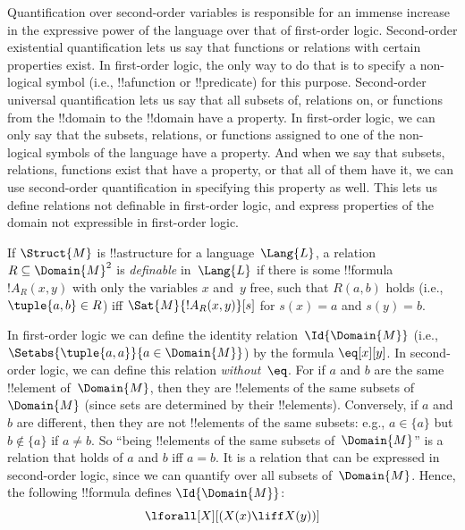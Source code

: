 \documentclass[../../../include/open-logic-section]{subfiles}
\begin{document}

\begin{explain}
Quantification over second-order variables is responsible for an
immense increase in the expressive power of the language over that of
first-order logic.  Second-order existential quantification lets us
say that functions or relations with certain properties exist. In
first-order logic, the only way to do that is to specify a non-logical
symbol (i.e., !!a{function} or !!{predicate}) for this
purpose. Second-order universal quantification lets us say that all
subsets of, relations on, or functions from the !!{domain} to the
!!{domain} have a property.  In first-order logic, we can only say
that the subsets, relations, or functions assigned to one of the
non-logical symbols of the language have a property.  And when we say
that subsets, relations, functions exist that have a property, or that
all of them have it, we can use second-order quantification in
specifying this property as well. This lets us define relations not
definable in first-order logic, and express properties of the domain
not expressible in first-order logic.
\end{explain}

\begin{defn}
If $\Struct{M}$ is !!a{structure} for a language~$\Lang{L}$, a
relation~$R \subseteq \Domain{M}^2$ is \emph{definable} in~$\Lang{L}$
if there is some !!{formula}~$!A_R(x, y)$ with only the variables $x$
and~$y$ free, such that $R(a, b)$ holds (i.e., $\tuple{a,b} \in R$)
iff $\Sat{M}{!A_R(x, y)}[s]$ for $s(x) = a$ and $s(y) = b$.
\end{defn}

\begin{ex}
In first-order logic we can define the identity
relation~$\Id{\Domain{M}}$ (i.e., $\Setabs{\tuple{a,a}}{a \in
  \Domain{M}}$) by the formula $\eq[x][y]$.  In
second-order logic, we can define this relation
\emph{without~$\eq$}. For if $a$ and $b$ are the same !!{element}
of~$\Domain{M}$, then they are !!{element}s of the same subsets
of~$\Domain{M}$ (since sets are determined by their
!!{element}s). Conversely, if $a$ and $b$ are different, then they are
not !!{element}s of the same subsets: e.g., $a \in \{a\}$ but $b
\notin \{a\}$ if $a \neq b$.  So ``being !!{element}s of the same
subsets of~$\Domain{M}$'' is a relation that holds of $a$ and $b$ iff
$a = b$. It is a relation that can be expressed in second-order logic,
since we can quantify over all subsets of~$\Domain{M}$. Hence, the
following !!{formula} defines $\Id{\Domain{M}}$:
\[
\lforall[X][(X(x) \liff X(y))]
\]
\end{ex}
\end{document}
